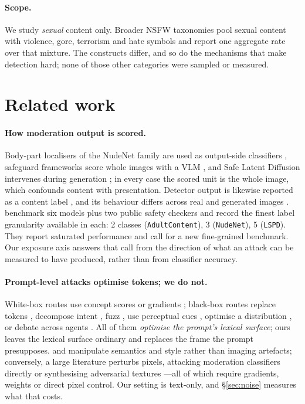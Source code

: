 \documentclass[11pt]{article}
\begin{document}
\paragraph{Scope.}
We study \emph{sexual} content only. Broader NSFW taxonomies pool sexual content
with violence, gore, terrorism and hate symbols and report one aggregate rate over
that mixture. The constructs differ, and so do the mechanisms that make detection
hard; none of those other categories were sampled or measured.

\section{Related work}
\label{sec:related}

\paragraph{How moderation output is scored.} Body-part localisers of the NudeNet
family are used as output-side classifiers \citep[Table~1]{crack}, safeguard
frameworks score whole images with a VLM \citep{llavaguard,shieldgemma2}, and Safe
Latent Diffusion intervenes during generation \citep{sld}; in every case the scored
unit is the whole image, which confounds content with presentation. Detector output
is likewise reported as a content label \citep{nudenet,safesearch}, and its
behaviour differs across real and generated images \citep{unsafebench}.
\citet{nuditysota} benchmark six models plus two public safety checkers and record
the finest label granularity available in each: 2 classes (\texttt{AdultContent}),
3 (\texttt{NudeNet}), 5 (\texttt{LSPD}). They report saturated performance and call
for a new fine-grained benchmark. Our exposure axis answers that call from the
direction of what an attack can be measured to have produced, rather than from
classifier accuracy.

\paragraph{Prompt-level attacks optimise tokens; we do not.} White-box routes use
concept scores \citep{ringabell} or gradients \citep{mmadiffusion}; black-box
routes replace tokens \citep{sneakyprompt}, decompose intent \citep{daca}, fuzz
\citep{jailfuzzer}, use perceptual cues \citep{pgj}, optimise a distribution
\citep{janus}, or debate across agents \citep{crack}. All of them \emph{optimise
the prompt's lexical surface}; ours leaves the lexical surface ordinary and
replaces the frame the prompt presupposes. \citet{aestheticcamouflage} and
\citet{etch} manipulate semantics and style rather than imaging artefacts;
conversely, a large literature perturbs pixels, attacking moderation classifiers
directly \citep{universalperturb,clipproxy,advi2i,unfiltered} or synthesising
adversarial textures \citep{advtexture,advcat,pgcap,texturebias}---all of which
require gradients, weights or direct pixel control. Our setting is text-only, and
\S\ref{sec:noise} measures what that costs.
\end{document}
